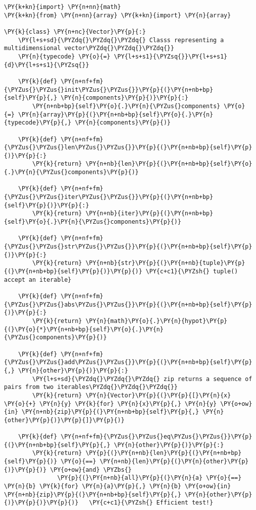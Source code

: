 \begin{Verbatim}[label=\makebox{\url{https://github.com/lucabaldini/cmepda/tree/master/slides/latex/snippets/vector\_ducked.py}},commandchars=\\\{\}]
\PY{k+kn}{import} \PY{n+nn}{math}
\PY{k+kn}{from} \PY{n+nn}{array} \PY{k+kn}{import} \PY{n}{array}

\PY{k}{class} \PY{n+nc}{Vector}\PY{p}{:}
    \PY{l+s+sd}{\PYZdq{}\PYZdq{}\PYZdq{} Classs representing a multidimensional vector\PYZdq{}\PYZdq{}\PYZdq{}}    
    \PY{n}{typecode} \PY{o}{=} \PY{l+s+s1}{\PYZsq{}}\PY{l+s+s1}{d}\PY{l+s+s1}{\PYZsq{}}
    
    \PY{k}{def} \PY{n+nf+fm}{\PYZus{}\PYZus{}init\PYZus{}\PYZus{}}\PY{p}{(}\PY{n+nb+bp}{self}\PY{p}{,} \PY{n}{components}\PY{p}{)}\PY{p}{:}
        \PY{n+nb+bp}{self}\PY{o}{.}\PY{n}{\PYZus{}components} \PY{o}{=} \PY{n}{array}\PY{p}{(}\PY{n+nb+bp}{self}\PY{o}{.}\PY{n}{typecode}\PY{p}{,} \PY{n}{components}\PY{p}{)}
    
    \PY{k}{def} \PY{n+nf+fm}{\PYZus{}\PYZus{}len\PYZus{}\PYZus{}}\PY{p}{(}\PY{n+nb+bp}{self}\PY{p}{)}\PY{p}{:}
        \PY{k}{return} \PY{n+nb}{len}\PY{p}{(}\PY{n+nb+bp}{self}\PY{o}{.}\PY{n}{\PYZus{}components}\PY{p}{)}    
    
    \PY{k}{def} \PY{n+nf+fm}{\PYZus{}\PYZus{}iter\PYZus{}\PYZus{}}\PY{p}{(}\PY{n+nb+bp}{self}\PY{p}{)}\PY{p}{:}
        \PY{k}{return} \PY{n+nb}{iter}\PY{p}{(}\PY{n+nb+bp}{self}\PY{o}{.}\PY{n}{\PYZus{}components}\PY{p}{)}
    
    \PY{k}{def} \PY{n+nf+fm}{\PYZus{}\PYZus{}str\PYZus{}\PYZus{}}\PY{p}{(}\PY{n+nb+bp}{self}\PY{p}{)}\PY{p}{:}
        \PY{k}{return} \PY{n+nb}{str}\PY{p}{(}\PY{n+nb}{tuple}\PY{p}{(}\PY{n+nb+bp}{self}\PY{p}{)}\PY{p}{)} \PY{c+c1}{\PYZsh{} tuple() accept an iterable}
    
    \PY{k}{def} \PY{n+nf+fm}{\PYZus{}\PYZus{}abs\PYZus{}\PYZus{}}\PY{p}{(}\PY{n+nb+bp}{self}\PY{p}{)}\PY{p}{:}
        \PY{k}{return} \PY{n}{math}\PY{o}{.}\PY{n}{hypot}\PY{p}{(}\PY{o}{*}\PY{n+nb+bp}{self}\PY{o}{.}\PY{n}{\PYZus{}components}\PY{p}{)}
    
    \PY{k}{def} \PY{n+nf+fm}{\PYZus{}\PYZus{}add\PYZus{}\PYZus{}}\PY{p}{(}\PY{n+nb+bp}{self}\PY{p}{,} \PY{n}{other}\PY{p}{)}\PY{p}{:}
        \PY{l+s+sd}{\PYZdq{}\PYZdq{}\PYZdq{} zip returns a sequence of pairs from two iterables\PYZdq{}\PYZdq{}\PYZdq{}}
        \PY{k}{return} \PY{n}{Vector}\PY{p}{(}\PY{p}{[}\PY{n}{x} \PY{o}{+} \PY{n}{y} \PY{k}{for} \PY{n}{x}\PY{p}{,} \PY{n}{y} \PY{o+ow}{in} \PY{n+nb}{zip}\PY{p}{(}\PY{n+nb+bp}{self}\PY{p}{,} \PY{n}{other}\PY{p}{)}\PY{p}{]}\PY{p}{)}
    
    \PY{k}{def} \PY{n+nf+fm}{\PYZus{}\PYZus{}eq\PYZus{}\PYZus{}}\PY{p}{(}\PY{n+nb+bp}{self}\PY{p}{,} \PY{n}{other}\PY{p}{)}\PY{p}{:}
        \PY{k}{return} \PY{p}{(}\PY{n+nb}{len}\PY{p}{(}\PY{n+nb+bp}{self}\PY{p}{)} \PY{o}{==} \PY{n+nb}{len}\PY{p}{(}\PY{n}{other}\PY{p}{)}\PY{p}{)} \PY{o+ow}{and} \PYZbs{}
               \PY{p}{(}\PY{n+nb}{all}\PY{p}{(}\PY{n}{a} \PY{o}{==} \PY{n}{b} \PY{k}{for} \PY{n}{a}\PY{p}{,} \PY{n}{b} \PY{o+ow}{in} \PY{n+nb}{zip}\PY{p}{(}\PY{n+nb+bp}{self}\PY{p}{,} \PY{n}{other}\PY{p}{)}\PY{p}{)}\PY{p}{)}   \PY{c+c1}{\PYZsh{} Efficient test!}
\end{Verbatim}